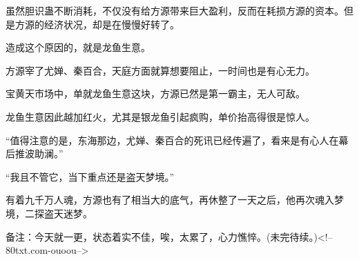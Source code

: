 \begin{this_body}
虽然胆识蛊不断消耗，不仅没有给方源带来巨大盈利，反而在耗损方源的资本。但是方源的经济状况，却是在慢慢好转了。

造成这个原因的，就是龙鱼生意。

方源宰了尤婵、秦百合，天庭方面就算想要阻止，一时间也是有心无力。

宝黄天市场中，单就龙鱼生意这块，方源已然是第一霸主，无人可敌。

龙鱼生意因此越加红火，尤其是银龙鱼引起疯购，单价抬高得很是惊人。

“值得注意的是，东海那边，尤婵、秦百合的死讯已经传遍了，看来是有心人在幕后推波助澜。”

“我且不管它，当下重点还是盗天梦境。”

有着九千万人魂，方源也有了相当大的底气，再休整了一天之后，他再次魂入梦境，二探盗天迷梦。

备注：今天就一更，状态着实不佳，唉，太累了，心力憔悴。(未完待续。)<!--80txt.com-ouoou-->

\end{this_body}

